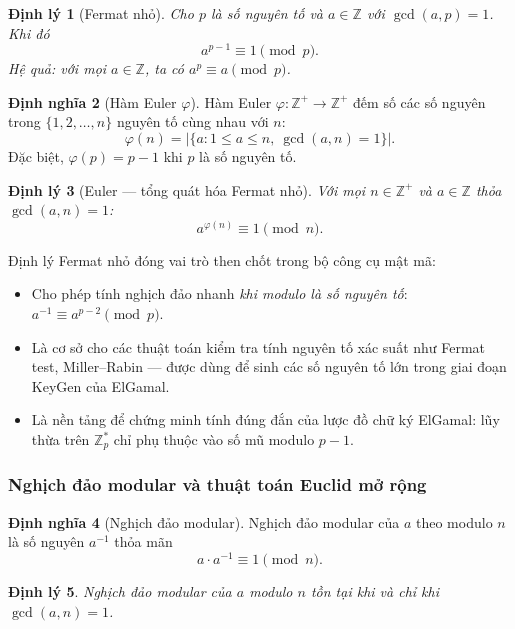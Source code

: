 \documentclass[12pt,a4paper]{report}
\newtheorem{theorem}{Định lý}[chapter]
\theoremstyle{definition}
\newtheorem{definition}[theorem]{Định nghĩa}
\theoremstyle{remark}
\begin{document}
\begin{theorem}[Fermat nhỏ]
\label{thm:fermat}
Cho $p$ là số nguyên tố và $a \in \mathbb{Z}$ với $\gcd(a, p) = 1$. Khi đó
\[
a^{p-1} \equiv 1 \pmod{p}.
\]
Hệ quả: với mọi $a \in \mathbb{Z}$, ta có $a^{p} \equiv a \pmod{p}$.
\end{theorem}

\begin{definition}[Hàm Euler $\varphi$]
Hàm Euler $\varphi: \mathbb{Z}^+ \to \mathbb{Z}^+$ đếm số các số nguyên trong $\{1, 2, \ldots, n\}$ nguyên tố cùng nhau với $n$:
\[
\varphi(n) = |\{a : 1 \leq a \leq n,\ \gcd(a, n) = 1\}|.
\]
Đặc biệt, $\varphi(p) = p - 1$ khi $p$ là số nguyên tố.
\end{definition}

\begin{theorem}[Euler — tổng quát hóa Fermat nhỏ]
Với mọi $n \in \mathbb{Z}^+$ và $a \in \mathbb{Z}$ thỏa $\gcd(a, n) = 1$:
\[
a^{\varphi(n)} \equiv 1 \pmod{n}.
\]
\end{theorem}

Định lý Fermat nhỏ đóng vai trò then chốt trong bộ công cụ mật mã:
\begin{itemize}[leftmargin=*]
    \item Cho phép tính nghịch đảo nhanh \emph{khi modulo là số nguyên tố}: $a^{-1} \equiv a^{p-2} \pmod{p}$.
    \item Là cơ sở cho các thuật toán kiểm tra tính nguyên tố xác suất như Fermat test, Miller--Rabin --- được dùng để sinh các số nguyên tố lớn trong giai đoạn KeyGen của ElGamal.
    \item Là nền tảng để chứng minh tính đúng đắn của lược đồ chữ ký ElGamal: lũy thừa trên $\mathbb{Z}_p^*$ chỉ phụ thuộc vào số mũ modulo $p-1$.
\end{itemize}

\subsubsection{Nghịch đảo modular và thuật toán Euclid mở rộng}

\begin{definition}[Nghịch đảo modular]
Nghịch đảo modular của $a$ theo modulo $n$ là số nguyên $a^{-1}$ thỏa mãn
\[
a \cdot a^{-1} \equiv 1 \pmod{n}.
\]
\end{definition}

\begin{theorem}
Nghịch đảo modular của $a$ modulo $n$ tồn tại khi và chỉ khi $\gcd(a, n) = 1$.
\end{theorem}
\end{document}
